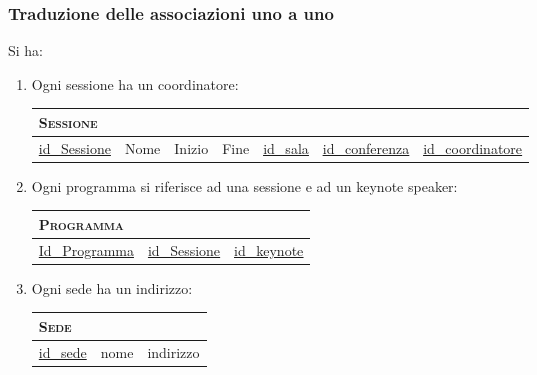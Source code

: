 \subsubsection{Traduzione delle associazioni uno a uno}
Si ha:
\begin{enumerate}
	\item Ogni sessione ha un coordinatore:

		\begin{tabular}{|l|l|l|l|l|l|l|}
			\multicolumn{7}{l}{\textsc{Sessione}} \\ \hline
			\underline{id\_Sessione} & Nome & Inizio & Fine & \underline{\underline{id\_sala}}& \underline{\underline{id\_conferenza}} & \underline{\underline{id\_coordinatore}} \\ \hline
		\end{tabular}

\item Ogni programma si riferisce ad una sessione e ad un keynote speaker:

	\begin{tabular}{|l|l|l|}
		\multicolumn{1}{l}{\textsc{Programma}} \\ \hline
		\underline{Id\_Programma} & \underline{\underline{id\_Sessione}} & \underline{\underline{id\_keynote}}\\ \hline
	\end{tabular}
\item Ogni sede ha un indirizzo:

	\begin{tabular}{|l|l|l|}
		\multicolumn{3}{l}{\textsc{Sede}} \\ \hline
		\underline{id\_sede} & nome & indirizzo \\ \hline
	\end{tabular}
\end{enumerate}
